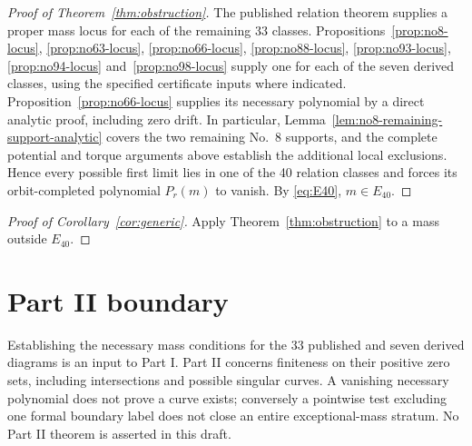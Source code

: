\documentclass[11pt]{amsart}
\theoremstyle{remark}
\begin{document}
\begin{proof}[Proof of Theorem~\ref{thm:obstruction}]
The published relation theorem supplies a proper mass locus for each
of the remaining 33 classes. Propositions~\ref{prop:no8-locus},
\ref{prop:no63-locus}, \ref{prop:no66-locus},
\ref{prop:no88-locus}, \ref{prop:no93-locus},
\ref{prop:no94-locus} and~\ref{prop:no98-locus} supply one for each
of the seven derived classes, using the specified certificate inputs where indicated. Proposition~\ref{prop:no66-locus} supplies its necessary polynomial by a direct analytic proof, including zero drift. In particular, Lemma~\ref{lem:no8-remaining-support-analytic} covers the two remaining No.~8 supports, and the complete potential and torque arguments above establish the additional local exclusions. Hence every possible first limit lies in one of the 40 relation classes and forces its orbit-completed polynomial $P_r(m)$ to vanish. By \eqref{eq:E40}, $m\in E_{40}$.
\end{proof}
\begin{proof}[Proof of Corollary~\ref{cor:generic}]
Apply Theorem~\ref{thm:obstruction} to a mass outside $E_{40}$.
\end{proof}

\section{Part II boundary}\label{sec:partII}
Establishing the necessary mass conditions for the 33 published and seven derived diagrams is an input to Part I. Part II concerns finiteness on their positive zero sets, including intersections and possible singular curves. A vanishing necessary polynomial does not prove a curve exists; conversely a pointwise test excluding one formal boundary label does not close an entire exceptional-mass stratum. No Part II theorem is asserted in this draft.

\appendix
\end{document}
